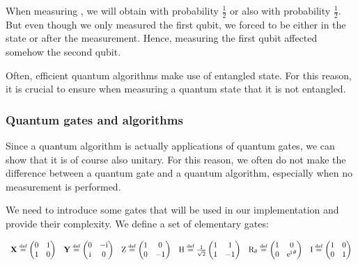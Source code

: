 \documentclass[11pt, a4paper]{article}
\begin{document}
                When measuring \ket{\varphi}, we will obtain   with probability \(\frac12\) or  also with probability \(\frac12\). But even though we only measured the first qubit, we forced \ket{\varphi} to be either in the state  or  after the measurement. Hence, measuring the first qubit affected somehow the second qubit.
                
                Often, efficient quantum algorithms make use of entangled state. For this reason, it is crucial to ensure when measuring a quantum state that it is not entangled.
            \subsubsection{Quantum gates and algorithms}
                Since a quantum algorithm is actually applications of quantum gates, we can show that it is of course also unitary. For this reason, we often do not make the difference between a quantum gate and a quantum algorithm, especially when no measurement is performed.
                
                We need to introduce some gates that will be used in our implementation and provide their complexity. We define a set of elementary gates:
                
                \[\begin{array}{ccccccc}\X\overset{\text{\tiny{def}}}{=}\begin{pmatrix}0 & 1\\1 & 0\end{pmatrix} & \mathbf{Y}\overset{\text{\tiny{def}}}{=}\begin{pmatrix}0&\mathrm{-i}\\\mathrm{i} & 0\end{pmatrix}&\mathrm{Z}\overset{\text{\tiny{def}}}{=}\begin{pmatrix}1 & 0\\0 & -1\end{pmatrix}&\mathrm{H}\overset{\text{\tiny{def}}}{=}\frac{1}{\sqrt{2}}\begin{pmatrix}1 & 1\\1 & -1\end{pmatrix}&\mathrm{R}_{\theta}\overset{\text{\tiny{def}}}{=}\begin{pmatrix}1 & 0\\0 & \mathrm{e}^{\mathrm{i}\,\theta}\end{pmatrix}&\mathrm{I}\overset{\text{\tiny{def}}}{=}\begin{pmatrix}1 & 0\\0 & 1\end{pmatrix}\end{array}\]
                
\end{document}
